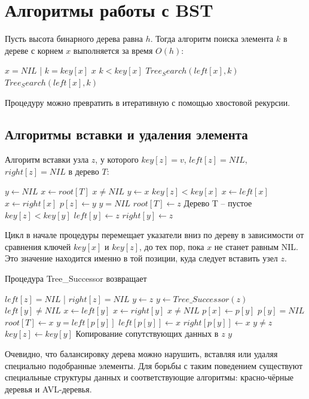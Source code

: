 \documentclass[11pt]{article}
\begin{document}
\section{Алгоритмы работы с BST}
Пусть высота бинарного дерева равна $h$. Тогда алгоритм поиска элемента $k$ в дереве с корнем $x$ выполняется за время $O(h)$:
\begin{codebox}
\li \If $x = NIL$ | $k = key[x]$
\li \Then \Return $x$
\End
\li \If $k < key[x]$
\li \Then \Return $Tree_Search(left[x], k)$
\li \Else \Return $Tree_Search(left[x], k)$
\End
\end{codebox}
Процедуру можно превратить в итеративную с помощью хвостовой рекурсии.

\subsection{Алгоритмы вставки и удаления элемента}
Алгоритм вставки узла $z$, у которого $key[z] = v$, $left[z] = NIL$, $right[z] = NIL$ в дерево $T$:
\begin{codebox}
\li $y \gets NIL$
\li $x \gets root[T]$
\li \While $x \neq NIL$
\li   \Do $y \gets x$
\li     \If $key[z] < key[x]$
\li       \Then $x \gets left[x]$
\li       \Else $x \gets right[x]$
  \End
\End
\li $p[z] \gets y$
\li \If $y = NIL$
\li   \Then $root[T] \gets z$ \Comment Дерево T -- пустое
\li   \Else \If $key[z] < key[y]$
\li       \Then $left[y] \gets z$
\li       \Else $right[y] \gets z$
  \End
\End
\end{codebox}

Цикл в начале процедуры перемещает указатели вниз по дереву в зависимости от сравнения ключей $key[x]$ и $key[z]$, до тех пор, пока $x$ не станет равным NIL. Это значение находится именно в той позиции, куда следует вставить узел $z$.

Процедура Tree\_Successor возвращает 

\begin{codebox}
\li \If $left[z] = NIL$ | $right[z] = NIL$
\li   \Then $y \gets z$
\li   \Else $y \gets Tree\_Successor(z)$
  \End
\li \If $left[y] \neq NIL$
\li   \Then $x \gets left[y]$
\li   \Else $x \gets right[y]$
  \End
\li \If $x \neq NIL$
\li   \Then $p[x] \gets p[y]$
  \End
\li \If $p[y] = NIL$
\li   \Then $root[T] \gets x$
\li   \Else \If $y = left[p[y]]$
\li         \Then $left[p[y]] \gets x$
\li         \Else $right[p[y]] \gets x$
  \End
\End
\li \If $y \neq z$
\li   \Then $key[z] \gets key[y]$
\li   \Comment Копирование сопутствующих данных в $z$
  \End
\li \Return $y$
\End
\end{codebox}

Очевидно, что балансировку дерева можно нарушить, вставляя или удаляя специально подобранные элементы. Для борьбы с таким поведением существуют специальные структуры данных и соответствующие алгоритмы: красно-чёрные деревья и AVL-деревья.
\end{document}
